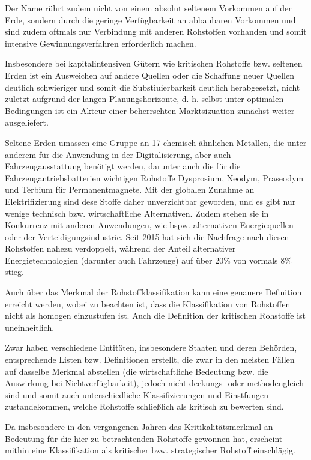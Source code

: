 \documentclass[12pt,a4paper,oneside]{book} %
\begin{document}
	Der Name rührt zudem nicht von einem absolut seltenem Vorkommen auf der Erde, sondern durch die geringe Verfügbarkeit an abbaubaren Vorkommen und sind zudem oftmals nur Verbindung mit anderen Rohstoffen vorhanden und somit intensive Gewinnungsverfahren erforderlich machen.\autocite{IEA, 2021}
	
	Insbesondere bei kapitalintensiven Gütern wie kritischen Rohstoffe bzw. seltenen Erden ist ein Ausweichen auf andere Quellen oder die Schaffung neuer Quellen deutlich schwieriger und somit die Substiuierbarkeit deutlich herabgesetzt, nicht zuletzt aufgrund der langen Planungshorizonte, d. h. selbst unter optimalen Bedingungen ist ein Akteur einer beherrschten Marktsizuation zunächst weiter ausgeliefert.
	
	Seltene Erden umassen eine Gruppe an 17 chemisch ähnlichen Metallen, die unter anderem für die Anwendung in der Digitalisierung, aber auch Fahrzeugausstattung benötigt werden, darunter auch die für die Fahrzeugantriebsbatterien wichtigen Rohstoffe Dysprosium, Neodym, Praseodym und Terbium für Permanentmagnete. Mit der globalen Zunahme an Elektrifizierung sind dese Stoffe daher unverzichtbar geworden, und es gibt nur wenige technisch bzw. wirtschaftliche Alternativen. Zudem stehen sie in Konkurrenz mit anderen Anwendungen, wie bspw. alternativen Energiequellen oder der Verteidigungsindustrie.
	Seit 2015 hat sich die Nachfrage nach diesen Rohstoffen nahezu verdoppelt, während der Anteil alternativer Energietechnologien (darunter auch Fahrzeuge) auf über 20\% von vormals 8\% stieg.\autocite{International Energy Agency (June 2025). Global Critical Minerals Outlook 2025}
	
	Auch über das Merkmal der Rohstoffklassifikation kann eine genauere Definition erreicht werden, wobei zu beachten ist, dass die Klassifikation von Rohstoffen nicht als homogen einzustufen ist.\autocite{Hilgers et al. 2023} Auch die Definition der kritischen Rohstoffe ist uneinheitlich.\autocite{Darby, 2026}
	
	Zwar haben verschiedene Entitäten, insbesondere Staaten und deren Behörden, entsprechende Listen bzw. Definitionen erstellt, die zwar in den meisten Fällen auf dasselbe Merkmal abstellen (die wirtschaftliche Bedeutung bzw. die Auswirkung bei Nichtverfügbarkeit), jedoch nicht deckungs- oder methodengleich sind und somit auch unterschiedliche Klassifizierungen und Einstfungen zustandekommen, welche Rohstoffe schließlich als kritisch zu bewerten sind.
	
	Da insbesondere in den vergangenen Jahren das Kritikalitätsmerkmal an Bedeutung für die hier zu betrachtenden Rohstoffe gewonnen hat, erscheint mithin eine Klassifikation als kritischer bzw. strategischer Rohstoff einschlägig.
	
\end{document}
